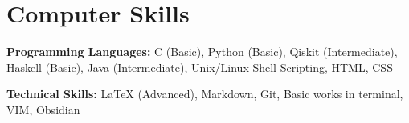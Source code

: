 \documentclass[letterpaper,10pt]{article}
\newenvironment{resume_list}{
  \vspace{-7pt}
  \begin{itemize}[itemsep=-2px, parsep=1pt, leftmargin=30pt, label={$\circ$}]
}{
  \end{itemize}
}
\begin{document}

  \section{Computer Skills}

  
  \begin{resume_list}
    \item \textbf{Programming Languages:} C (Basic), Python (Basic), Qiskit (Intermediate), Haskell (Basic), Java (Intermediate), Unix/Linux
    Shell Scripting, HTML, CSS
    \item \textbf{Technical Skills:} LaTeX (Advanced), Markdown, Git, Basic works in terminal, VIM, Obsidian
  \end{resume_list}
\end{document}

